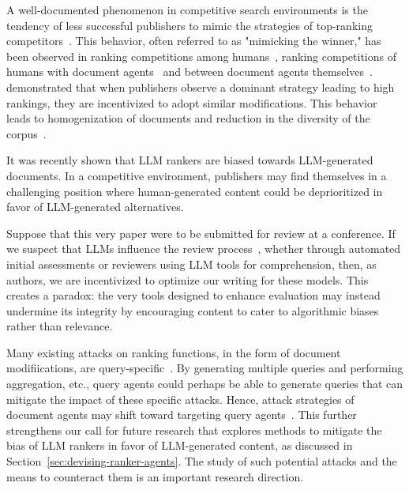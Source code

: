 A well-documented phenomenon in competitive search environments is the tendency of less successful publishers to mimic the strategies of top-ranking competitors~\cite{Nimrod,Greg-bot,Greg-Herding,MultQueries,Lemss}.
This behavior, often referred to as "mimicking the winner," has been observed in ranking competitions among humans~\cite{Nimrod}, ranking competitions of humans with document agents~\cite{Greg-bot,Niv,MultQueries} and between document agents themselves~\cite{Lemss}. \citet{Nimrod} demonstrated that when publishers observe a dominant strategy leading to high rankings, they are incentivized to adopt similar modifications. This behavior leads to homogenization of documents and reduction in the diversity of the corpus~\cite{Greg-Herding}.

It was recently shown \cite{neural-llm-bias, dai2024cocktail} that LLM rankers are biased towards LLM-generated documents.
In a competitive environment, publishers may find themselves in a challenging position where human-generated content could be deprioritized in favor of LLM-generated alternatives.

Suppose that this very paper were to be submitted for review at a conference.
If we suspect that LLMs influence the review process~\cite{conference-llm-reviews}, whether
through automated initial assessments or reviewers using LLM
tools for comprehension, then, as authors, we are incentivized to
optimize our writing for these models. This creates a paradox: the
very tools designed to enhance evaluation may instead undermine its integrity by encouraging content to cater to algorithmic biases rather than relevance.

Many existing attacks on ranking functions, in the form of document modifiications, are query-specific~\cite{Wang+al:22a, Greg-Herding,Liu+al:22a,Song+al:22a,Wang+al:22a,Wu+al:22a,Chen+al:23a,Chen+al:23b}. By generating multiple queries and performing aggregation, etc., query agents could perhaps be able to generate queries that can mitigate the impact of these specific attacks. 
Hence, attack strategies of document agents may shift toward targeting query agents~\cite{GEO}.
This further strengthens our call for future research that explores methods to mitigate the bias of LLM rankers in favor of LLM-generated content, as discussed in Section~\ref{sec:devising-ranker-agents}.
The study of such potential attacks and the means to counteract them is an important research direction.
 


